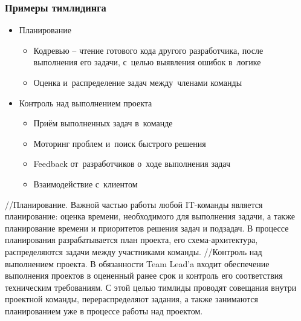 \documentclass{../industrial-development}
\begin{document}
\begin{frame} \frametitle{Примеры тимлидинга}
\begin{itemize}
	\item Планирование 
	\begin{itemize}
		\item Кодревью – чтение готового кода другого разработчика, после выполнения его задачи, с~целью выявления ошибок в~логике
		\item Оценка и~распределение задач между~членами команды 
	\end{itemize}
	\item Контроль над выполнением проекта
	\begin{itemize}
		\item Приём выполненных задач в~команде
		\item Моторинг проблем и~поиск быстрого решения 
		\item Feedback от~разработчиков о~ходе выполнения задач
		\item Взаимодействие с~клиентом 
	\end{itemize}
\end{itemize}
\end{frame}
\lecturenotes
//Планирование. Важной частью работы любой IT-команды является планирование: оценка времени, необходимого для выполнения задачи, а также планирование времени и приоритетов решения задач и подзадач. В процессе планирования разрабатывается план проекта, его схема-архитектура, распределяются задачи между участниками команды.
//Контроль над выполнением проекта. В обязанности Team Lead’a входит обеспечение выполнения проектов в оцененный ранее срок и контроль его соответствия техническим требованиям. С этой целью тимлиды проводят совещания внутри проектной команды, перераспределяют задания, а также занимаются планированием уже в процессе работы над проектом.
\end{document}
